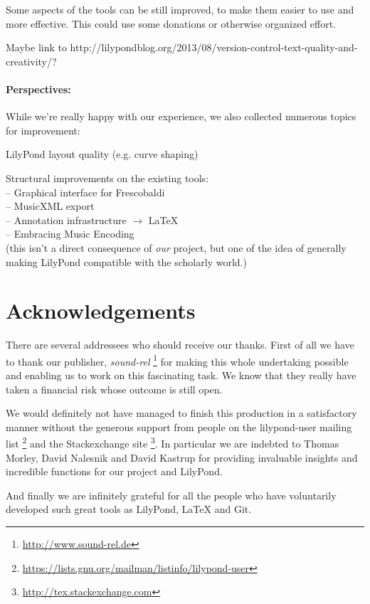\documentclass[11pt,a4paper]{article}
\begin{document}
Some aspects of the tools can be still improved, to make them easier to use and more
effective.  This could use some donations or otherwise organized effort.

Maybe link to http://lilypondblog.org/2013/08/version-control-text-quality-and-creativity/?

\paragraph{Perspectives:}
While we're really happy with our experience, we also collected numerous topics for
improvement:
\begin{itemize*}
\item LilyPond layout quality (e.g. curve shaping)
\item Structural improvements on the existing tools:\\
-- Graphical interface for Frescobaldi\\
-- MusicXML export\\
-- Annotation infrastructure $\rightarrow$ \LaTeX\\
-- Embracing Music Encoding\\
(this isn't a direct consequence of \emph{our} project, but one of the idea of
generally making LilyPond compatible with the scholarly world.)

\end{itemize*}

\section{Acknowledgements}

There are several addressees who should receive our thanks. First of all we have to thank our publisher, \emph{sound-rel}%
\footnote{\url{http://www.sound-rel.de}} for making this whole undertaking possible and
enabling us to work on this fascinating task. We know that they really have taken a financial
risk whose outcome is still open.

We would definitely not have managed to finish this production in a satisfactory manner
without the generous support from people on the lilypond-user mailing list%
\footnote{\url{https://lists.gnu.org/mailman/listinfo/lilypond-user}}
and the Stackexchange site%
\footnote{\url{http://tex.stackexchange.com}}. In particular we are indebted to
Thomas Morley, David Nalesnik and David Kastrup for providing invaluable insights and
incredible functions for our project and LilyPond.

And finally we are infinitely grateful for all the people who have voluntarily developed
such great tools as LilyPond, \LaTeX{} and Git.
\end{document}
